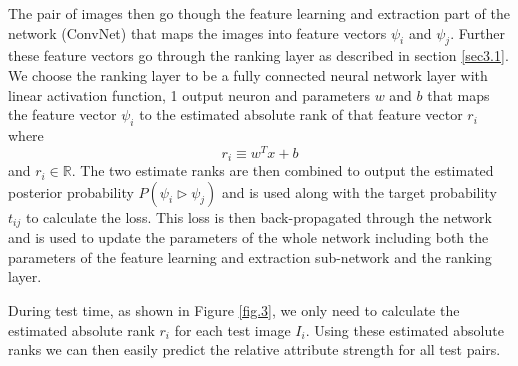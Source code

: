 The pair of images then go though the feature learning and extraction part of the network (ConvNet) that maps the images into feature vectors $\psi_i$ and $\psi_j$. Further these feature vectors go through the ranking layer as described in section \ref{sec3.1}. We choose the ranking layer to be a fully connected neural network layer with linear activation function, 1 output neuron and parameters $w$ and $b$ that maps the feature vector $\psi_i$ to the estimated absolute rank of that feature vector $r_i$ where
$$
r_i \equiv w^T x + b
$$
and $r_i \in \mathbb{R}$.
The two estimate ranks are then combined to output the estimated posterior probability $P(\psi_i \triangleright \psi_j)$ and is used along with the target probability $t_{ij}$ to calculate the loss. This loss is then back-propagated through the network and is used to update the parameters of the whole network including both the parameters of the feature learning and extraction sub-network and the ranking layer.

During test time, as shown in Figure \ref{fig.3}, we only need to calculate the estimated absolute rank $r_i$ for each test image $I_i$. Using these estimated absolute ranks we can then easily predict the relative attribute strength for all test pairs.